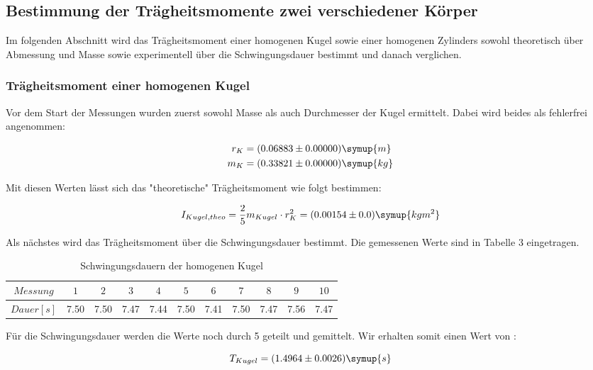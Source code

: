 \subsection{Bestimmung der Trägheitsmomente zwei verschiedener Körper}
Im folgenden Abschnitt wird das Trägheitsmoment einer homogenen Kugel sowie einer
homogenen Zylinders sowohl theoretisch über Abmessung und Masse sowie experimentell über
die Schwingungsdauer bestimmt und danach verglichen.

\subsubsection{Trägheitsmoment einer homogenen Kugel}
Vor dem Start der Messungen wurden zuerst sowohl Masse als auch Durchmesser der Kugel ermittelt.
Dabei wird beides als fehlerfrei angenommen:

\begin{align}
  r_K &= (0.06883 \pm 0.00000) \symup{m} \\
  m_K &= (0.33821 \pm 0.00000) \symup{kg}
\end{align}

Mit diesen Werten lässt sich das "theoretische" Trägheitsmoment wie folgt bestimmen:

\begin{equation}
  I_{Kugel,theo} = \frac{2}{5} m_{Kugel} \cdot r_K^2 = (0.00154 \pm 0.0) \symup{kg m^2}
\end{equation}

Als nächstes wird das Trägheitsmoment über die Schwingungsdauer bestimmt. Die gemessenen Werte
sind in Tabelle 3 eingetragen.

\begin{table}
  \centering
  \caption{Schwingungsdauern der homogenen Kugel}
  \begin{tabular}{c c c c c c c c c c c}
    \toprule $Messung$ & $1$ & $2$ & $3$ & $4$ & $5$ & $6$ & $7$ & $8$ & $9$ & $10$ \\
    \midrule $Dauer [s]$ & 7.50 & 7.50 & 7.47 & 7.44 & 7.50 & 7.41 & 7.50 & 7.47 & 7.56 & 7.47\\
    \bottomrule
  \end{tabular}
\end{table}

Für die Schwingungsdauer werden die Werte noch durch 5 geteilt und gemittelt. Wir erhalten somit einen Wert von :

\begin{equation}
  T_{Kugel} = (1.4964 \pm 0.0026) \symup{s}
\end{equation}


